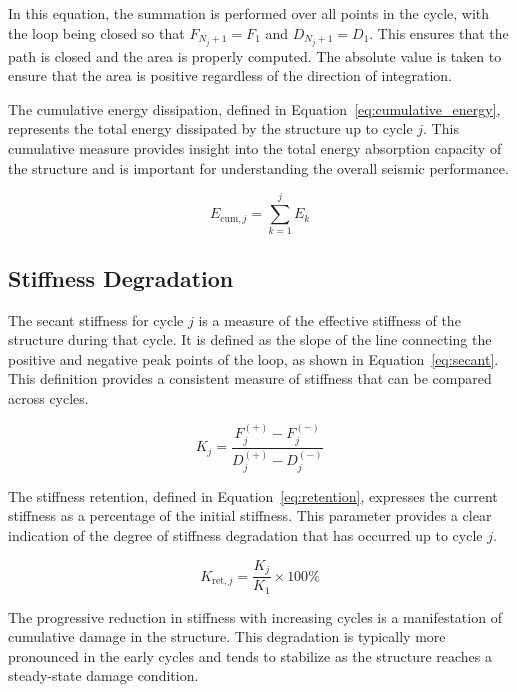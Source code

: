 \documentclass[11pt,a4paper]{article}
\begin{document}
In this equation, the summation is performed over all points in the cycle, with the loop being closed so that \(F_{N_j+1} = F_1\) and \(D_{N_j+1} = D_1\). This ensures that the path is closed and the area is properly computed. The absolute value is taken to ensure that the area is positive regardless of the direction of integration.

The cumulative energy dissipation, defined in Equation~\ref{eq:cumulative_energy}, represents the total energy dissipated by the structure up to cycle \(j\). This cumulative measure provides insight into the total energy absorption capacity of the structure and is important for understanding the overall seismic performance.

\begin{equation}
E_{\text{cum},j} = \sum_{k=1}^{j} E_k
\label{eq:cumulative_energy}
\end{equation}

\subsection{Stiffness Degradation}

The secant stiffness for cycle \(j\) is a measure of the effective stiffness of the structure during that cycle. It is defined as the slope of the line connecting the positive and negative peak points of the loop, as shown in Equation~\ref{eq:secant}. This definition provides a consistent measure of stiffness that can be compared across cycles.

\begin{equation}
K_j = \frac{F_j^{(+)} - F_j^{(-)}}{D_j^{(+)} - D_j^{(-)}}
\label{eq:secant}
\end{equation}

The stiffness retention, defined in Equation~\ref{eq:retention}, expresses the current stiffness as a percentage of the initial stiffness. This parameter provides a clear indication of the degree of stiffness degradation that has occurred up to cycle \(j\).

\begin{equation}
K_{\text{ret},j} = \frac{K_j}{K_1} \times 100\%
\label{eq:retention}
\end{equation}

The progressive reduction in stiffness with increasing cycles is a manifestation of cumulative damage in the structure. This degradation is typically more pronounced in the early cycles and tends to stabilize as the structure reaches a steady-state damage condition.
\end{document}
